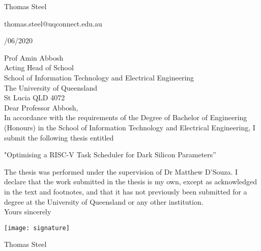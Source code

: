 \begin{flushright}
Thomas Steel\\

\vspace{5mm}

thomas.steel@uqconnect.edu.au \\
\end{flushright}

\vspace{20mm}

/06/2020

\vspace{5mm}

\noindent Prof Amin Abbosh\\
Acting Head of School\\
School of Information Technology and Electrical Engineering\\
The University of Queensland\\
St Lucia  QLD  4072\\

\noindent Dear Professor Abbosh,\\

\noindent In accordance with the requirements of the Degree of Bachelor of Engineering (Honours) in the School of Information Technology and Electrical Engineering, I submit the following thesis entitled

\begin{center} "Optimising a RISC-V Task Scheduler for Dark Silicon Parameters”\\ \end{center}


\noindent The thesis was performed under the supervision of Dr Matthew D’Souza. I declare that the work submitted in the thesis is my own, except as acknowledged in the text and footnotes, and that it has not previously been submitted for a degree at the University of Queensland or any other institution.\\

\noindent Yours sincerely

\vspace{5mm}

\texttt{[image: signature]}

\vspace{5mm}

\noindent Thomas Steel
